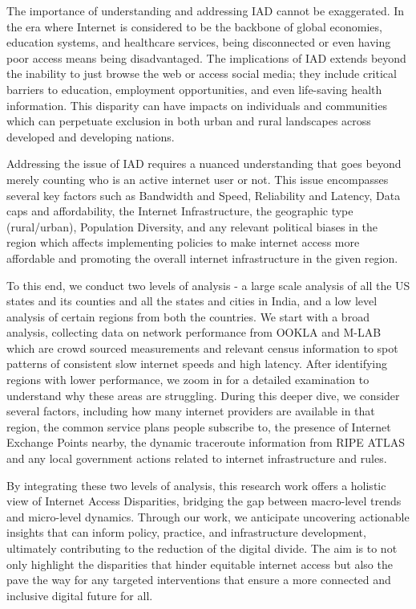 \documentclass[conference]{IEEEtran}
\begin{document}
   The importance of understanding and addressing IAD cannot be exaggerated. In the era where Internet is considered to be the backbone of global economies, education systems, and healthcare services, being disconnected or even having poor access means being disadvantaged. The implications of IAD extends beyond the inability to just browse the web or access social media; they include critical barriers to education, employment opportunities, and even life-saving health information. This disparity can have impacts on individuals and communities which can perpetuate exclusion in both urban and rural landscapes across developed and developing nations.
   
   Addressing the issue of IAD requires a nuanced understanding that goes beyond merely counting who is an active internet user or not. This issue encompasses several key factors such as Bandwidth and Speed, Reliability and Latency, Data caps and affordability, the Internet Infrastructure, the geographic type (rural/urban), Population Diversity, and any relevant political biases in the region which affects implementing policies to make internet access more affordable and promoting the overall internet infrastructure in the given region.

   To this end, we conduct two levels of analysis - a large scale analysis of all the US states and its counties and all the states and cities in India, and a low level analysis of certain regions from both the countries. We start with a broad analysis, collecting data on network performance from OOKLA \cite{11} and M-LAB \cite{10} which are crowd sourced measurements and relevant census information to spot patterns of consistent slow internet speeds and high latency. After identifying regions with lower performance, we zoom in for a detailed examination to understand why these areas are struggling. During this deeper dive, we consider several factors, including how many internet providers are available in that region, the common service plans people subscribe to, the presence of Internet Exchange Points nearby, the dynamic traceroute information from RIPE ATLAS \cite{12} and any local government actions related to internet infrastructure and rules.

   By integrating these two levels of analysis, this research work offers a holistic view of Internet Access Disparities, bridging the gap between macro-level trends and micro-level dynamics. Through our work, we anticipate uncovering actionable insights that can inform policy, practice, and infrastructure development, ultimately contributing to the reduction of the digital divide. The aim is to not only highlight the disparities that hinder equitable internet access but also the pave the way for any targeted interventions that ensure a more connected and inclusive digital future for all.
\end{document}
